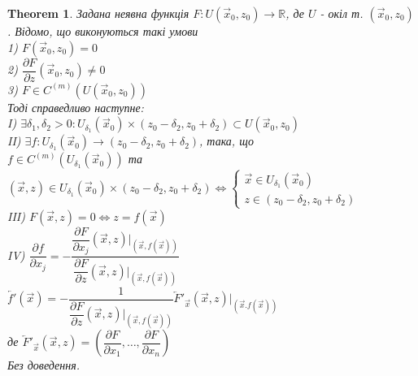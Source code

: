 \documentclass[a4paper, 14pt]{extarticle}
\def\bigline{\vspace{5mm}\\}
\theoremstyle{theoremdd}
\newtheorem{theorem}{Theorem}[subsection]
\theoremstyle{theoremdd}
\theoremstyle{theoremdd}
\theoremstyle{theoremdd}
\theoremstyle{theoremdd}
\theoremstyle{theoremdd}
\theoremstyle{theoremdd}
\theoremstyle{theoremdd}
\def\departial#1#2{\dfrac{\partial {#1}}{\partial {#2}}}
\begin{document}
\begin{theorem}
Задана неявна функція $F: U(\vec{x}_0,z_0) \to \mathbb{R}$, де $U$ - окіл т. $(\vec{x}_0,z_0)$. Відомо, що виконуються такі умови\\
1) $F(\vec{x}_0,z_0)=0$\\
2) $\departial{F}{z}(\vec{x}_0,z_0) \neq 0$\\
3) $F \in C^{(m)}(U(\vec{x}_0,z_0))$\\
Тоді справедливо наступне:\\
I) $\exists \delta_1,\delta_2 > 0: U_{\delta_1}(\vec{x}_0) \times (z_0-\delta_2,z_0+\delta_2) \subset U(\vec{x}_0,z_0)$\\
II) $\exists f: U_{\delta_1}(\vec{x}_0) \to (z_0-\delta_2,z_0+\delta_2)$, така, що \\ $f \in C^{(m)}(U_{\delta_1}(\vec{x}_0))$ та\\
$(\vec{x},z) \in U_{\delta_1}(\vec{x}_0) \times (z_0-\delta_2,z_0+\delta_2) \iff \begin{cases} \vec{x} \in U_{\delta_1}(\vec{x}_0) \\ z \in (z_0-\delta_2,z_0+\delta_2) \end{cases}$\\
III) $F(\vec{x},z) = 0 \iff z=f(\vec{x})$\\
IV) $\departial{f}{x_j} = -\dfrac{\departial{F}{x_j}(\vec{x},z) \Big|_{(\vec{x},f(\vec{x}))}}{\departial{F}{z}(\vec{x},z) \Big|_{(\vec{x},f(\vec{x}))}}$ \hspace{1.5cm} $\overleftarrow{f'}(\vec{x}) = -\dfrac{1}{\departial{F}{z}(\vec{x},z) \Big|_{(\vec{x}, f(\vec{x}))}} \overleftarrow{F}'_{\vec{x}}(\vec{x},z) \Big|_{(\vec{x}. f(\vec{x}))}$\\
де $\overleftarrow{F}'_{\vec{x}}(\vec{x},z) = \left( \departial{F}{x_1}, \dots, \departial{F}{x_n} \right)$\\
\textit{Без доведення.}
\bigline
\end{theorem}
\end{document}
